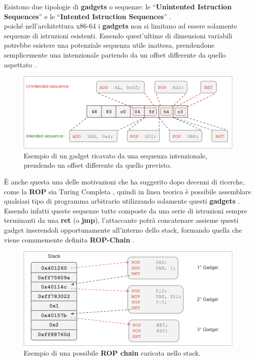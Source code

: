 Esistono due tipologie di \textbf{gadgets} o sequenze: le ``\textbf{Unintented Istruction Sequences}'' e le ``\textbf{Intented Istruction Sequences}'' \cite*{ROP-architecture}.\\
poiché nell'architettura x86-64 i \textbf{gadgets} non si limitano ad essere solamente sequenze di istruzioni esistenti. Essendo quest'ultime di dimensioni variabili potrebbe esistere una potenziale sequenza utile inattesa, prendendone
semplicemente una intenzionale partendo da un offset differente da quello aspettato \cite*{Gadgets-unintended}. 

\begin{figure}[ht]
    \centerline{\includegraphics[scale=.6]{images/Unintended-seq.png}}
    \caption{Esempio di un gadget ricavato da una sequenza intenzionale, prendendo un offset differente da quello previsto.}
    \label{fig:Unintended-seq}
\end{figure}

È anche questa una delle motivazioni che ha suggerito dopo decenni di ricerche, come la \textbf{ROP} sia Turing Completa \cite*{ROP-x86}\cite*{ROP-General}, quindi in linea 
teorica è possibile assemblare qualsiasi tipo di programma arbitrario utilizzando solamente questi \textbf{gadgets} \cite*{ROP-General2}. Essendo infatti queste sequenze tutte composte da una serie di istruzioni sempre
terminanti da una \textbf{ret} (o \textbf{jmp}), l'attaccante potrà concatenare assieme questi gadget inserendoli opportunamente all'interno dello stack, formando quella che viene comunemente definita \textbf{ROP-Chain} \cite*{ROP-Chain}.

\begin{figure}[h]
    \centerline{\includegraphics[scale=.6]{images/Rop-Chain.png}}
    \caption{Esempio di una possibile \textbf{ROP chain} caricata nello stack.}
    \label{fig:ROP-chain}
\end{figure}

